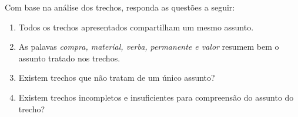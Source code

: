 

\vspace{0.5 cm} 
\noindent Com base na análise dos trechos, responda as questões a seguir:
\vspace{0.5 cm} 


\begin{enumerate}



\item Todos os trechos apresentados compartilham um mesmo assunto.
\likert




\item As palavas \textit{compra, material, verba, permanente e valor} resumem bem o assunto tratado nos trechos.
\likert




\item Existem trechos que não tratam de um único assunto?
\likertA



\item Existem trechos incompletos e insuficientes para compreensão do assunto do trecho?
\likertA



\end{enumerate}





%
%
%
%
%
















